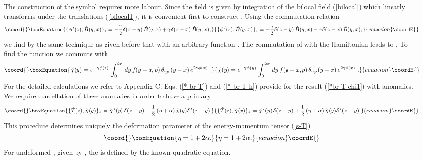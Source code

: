 \documentclass[a4paper,12pt]{article}
\begin{document}
The construction of the symbol \coordHE{} requires more labour.
Since the field \coordHE{} is given by  integration of the bilocal
field (\ref{bilocal}) which linearly transforms under the translations
(\ref{bilocal1}), it is convenient first to construct \coordHE{}.  Using the commutation relation
\begin{equation}\coord{}\boxEquation{\label{bil-phi'}
\{\phi\,'(z), \check B(y,x)\}_*=-\frac{\gamma}{2}\delta(z-y)\,
\check B(y,x)+
\gamma \delta(z-x)\,\check B(y,x),
}{\{\phi\,'(z), \check B(y,x)\}_*=-\frac{\gamma}{2}\delta(z-y)\,
\check B(y,x)+
\gamma \delta(z-x)\,\check B(y,x),
}{ecuacion}\coordE{}\end{equation}
 we find by the same
technique as given before that \coordHE{}
with an arbitrary function \coordHE{}. The commutation of \coordHE{}
with the Hamiltonian
\coordHE{}
leads to \coordHE{}.
To find the function
\coordHE{} we
commute \coordHE{} with
 \begin{equation}\coord{}\boxEquation{\label{s-chi}
{\check\chi}(y)= e^{-\gamma\phi (y)}\,\int_0^{2\pi}\,
dy\,f(y-x,p)\,\theta_{\gamma p}\, (y-x)\,e^{2\gamma\phi(x)}\,\,.
}{{\check\chi}(y)= e^{-\gamma\phi (y)}\,\int_0^{2\pi}\,
dy\,f(y-x,p)\,\theta_{\gamma p}\, (y-x)\,e^{2\gamma\phi(x)}\,\,.
}{ecuacion}\coordE{}\end{equation}
For the detailed calculations we refer to Appendix C.
Eqs. (\ref{*-br-T}) and (\ref{*-br-T-h}) provide for \coordHE{} the result (\ref{*br-T-chi1}) with
anomalies. We require cancellation of these anomalies  in order to have
a primary  \coordHE{}
\begin{equation}\coord{}\boxEquation{\label{*br-T-chi}
\{\check T (z),\check\chi(y)\}_*=\check\chi\,'(y)\,\delta (z-y) +
\frac{1}{2}
\left(\eta +\alpha\right)\check\chi(y)\delta\,'(z-y).
}{\{\check T (z),\check\chi(y)\}_*=\check\chi\,'(y)\,\delta (z-y) +
\frac{1}{2}
\left(\eta +\alpha\right)\check\chi(y)\delta\,'(z-y).
}{ecuacion}\coordE{}\end{equation}
This procedure determines uniquely the deformation parameter of the
energy-momentum tensor (\ref{s-T})
\begin{equation}\coord{}\boxEquation{\label{eta}
\eta =1 +{2\alpha}.
}{\eta =1 +{2\alpha}.
}{ecuacion}\coordE{}\end{equation}
For undeformed \coordHE{}, given by \myHighlight{$\gamma \rightarrow
\gamma\eta$}\coordHE{}, the \myHighlight{$\eta$}\coordHE{} is defined by the known quadratic
equation.
\end{document}
